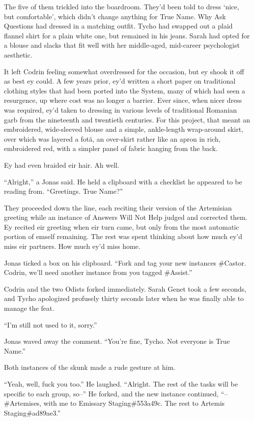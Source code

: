 The five of them trickled into the boardroom. They'd been told to dress `nice, but comfortable', which didn't change anything for True Name. Why Ask Questions had dressed in a matching outfit. Tycho had swapped out a plaid flannel shirt for a plain white one, but remained in his jeans. Sarah had opted for a blouse and slacks that fit well with her middle-aged, mid-career psychologist aesthetic.

It left Codrin feeling somewhat overdressed for the occasion, but ey shook it off as best ey could. A few years prior, ey'd written a short paper on traditional clothing styles that had been ported into the System, many of which had seen a resurgence, up where cost was no longer a barrier. Ever since, when nicer dress was required, ey'd taken to dressing in various levels of traditional Romanian garb from the nineteenth and twentieth centuries. For this project, that meant an embroidered, wide-sleeved blouse and a simple, ankle-length wrap-around skirt, over which was layered a fotă, an over-skirt rather like an apron in rich, embroidered red, with a simpler panel of fabric hanging from the back.

Ey had even braided eir hair. Ah well.

``Alright,'' a Jonas said. He held a clipboard with a checklist he appeared to be reading from. ``Greetings. True Name?''

They proceeded down the line, each reciting their version of the Artemisian greeting while an instance of Answers Will Not Help judged and corrected them. Ey recited eir greeting when eir turn came, but only from the most automatic portion of emself remaining. The rest was spent thinking about how much ey'd miss eir partners. How much ey'd miss home.

Jonas ticked a box on his clipboard. ``Fork and tag your new instances \#Castor. Codrin, we'll need another instance from you tagged \#Assist.''

Codrin and the two Odists forked immediately. Sarah Genet took a few seconds, and Tycho apologized profusely thirty seconds later when he was finally able to manage the feat.

``I'm still not used to it, sorry.''

Jonas waved away the comment. ``You're fine, Tycho. Not everyone is True Name.''

Both instances of the skunk made a rude gesture at him.

``Yeah, well, fuck you too.'' He laughed. ``Alright. The rest of the tasks will be specific to each group, so--'' He forked, and the new instance continued, ``--\#Artemises, with me to Emissary Staging\#553a49c. The rest to Artemis Staging\#ad89ae3.''

